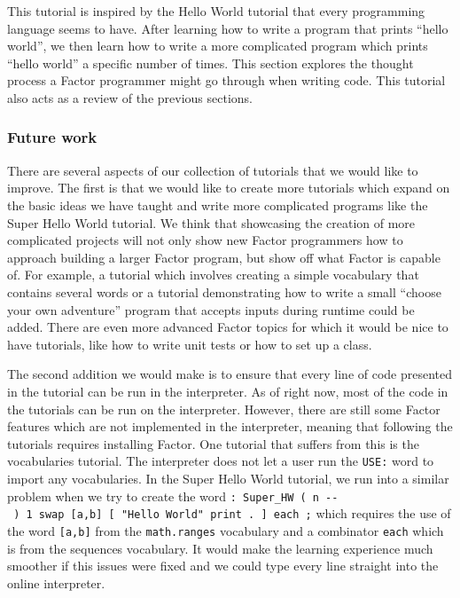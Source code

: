 \documentclass[
]{article}
\begin{document}
This tutorial is inspired by the Hello World tutorial that every
programming language seems to have. After learning how to write a
program that prints ``hello world'', we then learn how to write a more
complicated program which prints ``hello world'' a specific number of
times. This section explores the thought process a Factor programmer
might go through when writing code. This tutorial also acts as a review
of the previous sections.

\hypertarget{future-work}{%
\subsubsection{Future work}\label{future-work}}

There are several aspects of our collection of tutorials that we would
like to improve. The first is that we would like to create more
tutorials which expand on the basic ideas we have taught and write more
complicated programs like the Super Hello World tutorial. We think that
showcasing the creation of more complicated projects will not only show
new Factor programmers how to approach building a larger Factor program,
but show off what Factor is capable of. For example, a tutorial which
involves creating a simple vocabulary that contains several words or a
tutorial demonstrating how to write a small ``choose your own
adventure'' program that accepts inputs during runtime could be added.
There are even more advanced Factor topics for which it would be nice to
have tutorials, like how to write unit tests or how to set up a class.

The second addition we would make is to ensure that every line of code
presented in the tutorial can be run in the interpreter. As of right
now, most of the code in the tutorials can be run on the interpreter.
However, there are still some Factor features which are not implemented
in the interpreter, meaning that following the tutorials requires
installing Factor. One tutorial that suffers from this is the
vocabularies tutorial. The interpreter does not let a user run the
\texttt{USE:} word to import any vocabularies. In the Super Hello World
tutorial, we run into a similar problem when we try to create the word
\texttt{:\ Super\_HW\ (\ n\ -\/-\ )\ 1\ swap\ {[}a,b{]}\ {[}\ "Hello\ World"\ print\ .\ {]}\ each\ ;}
which requires the use of the word \texttt{{[}a,b{]}} from the
\texttt{math.ranges} vocabulary and a combinator \texttt{each} which is
from the sequences vocabulary. It would make the learning experience
much smoother if this issues were fixed and we could type every line
straight into the online interpreter.
\end{document}
